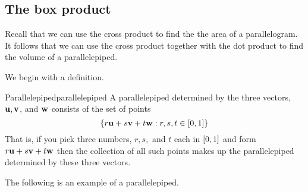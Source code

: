 \subsection{The box product}

Recall that we can use the cross product to find the the area of a parallelogram. It follows that we can use the 
cross product together with the dot product to find the volume of a parallelepiped.

We begin with a definition.

\begin{definition}{Parallelepiped}{parallelepiped}
A parallelepiped
 determined by the three vectors, ${\bf u},{\bf v}$, and ${\bf w}$ consists of the set of points
\begin{equation*}
\left\{r{\bf u}+s{\bf v}+t{\bf w}:r,s,t\in \left[0,1\right]
\right\} 
\end{equation*}
That is, if you pick three numbers, $r,s,$ and $t$ each in $\left[0,1\right]
$ and form $r{\bf u}+s{\bf v}+t{\bf w}$ then the collection of all
such points makes up the parallelepiped
determined by these three vectors.
\end{definition}

The following is an example of a parallelepiped.

\begin{center}
\end{center}

